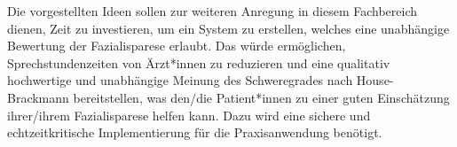 \vspace{1cm}
Die vorgestellten Ideen sollen zur weiteren Anregung in diesem Fachbereich dienen, Zeit zu investieren, um ein System zu erstellen, welches eine unabhängige Bewertung der Fazialisparese erlaubt. Das würde ermöglichen, Sprechstundenzeiten von Ärzt*innen zu reduzieren und eine qualitativ hochwertige und unabhängige Meinung des Schweregrades nach House-Brackmann bereitstellen, was den/die Patient*innen zu einer guten Einschätzung ihrer/ihrem Fazialisparese helfen kann. Dazu wird eine sichere und echtzeitkritische Implementierung für die Praxisanwendung benötigt.
